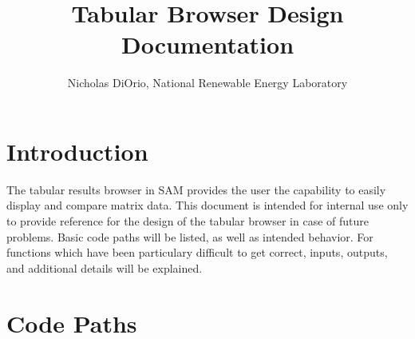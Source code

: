 \documentclass[11pt]{article} %
\title{Tabular Browser Design Documentation}
\author{Nicholas DiOrio, National Renewable Energy Laboratory}
\begin{document}
\maketitle

\section{Introduction}
The tabular results browser in SAM provides the user the capability to easily display and compare matrix data.  This document is intended for internal use only to provide reference for the design of the tabular browser in case of future problems.  Basic code paths will be listed, as well as intended behavior.  For functions which have been particulary difficult to get correct, inputs, outputs, and additional details will be explained.

\section{Code Paths}
\end{document}
